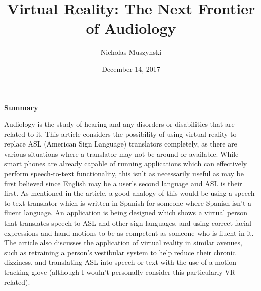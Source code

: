 \documentclass{article}
\begin{document}
\title{Virtual Reality: The Next Frontier of Audiology}
\author{Nicholas Muszynski}
\date{December 14, 2017}

\maketitle

\textbf{Summary}
\newline

Audiology is the study of hearing and any disorders or disabilities that are related to it. This article considers the possibility of using virtual reality to replace ASL (American Sign Language) translators completely, as there are various situations where a translator may not be around or available. While smart phones are already capable of running applications which can effectively perform speech-to-text functionality, this isn't as necessarily useful as may be first believed since English may be a user's second language and ASL is their first. As mentioned in the article, a good analogy of this would be using a speech-to-text translator which is written in Spanish for someone where Spanish isn't a fluent language. An application is being designed which shows a virtual person that translates speech to ASL and other sign languages, and using correct facial expressions and hand motions to be as competent as someone who is fluent in it. The article also discusses the application of virtual reality in similar avenues, such as retraining a person's vestibular system to help reduce their chronic dizziness, and translating ASL into speech or text with the use of a motion tracking glove (although I wouln't personally consider this particularly VR-related).

\nocite{audiologyCite}



\end{document}
